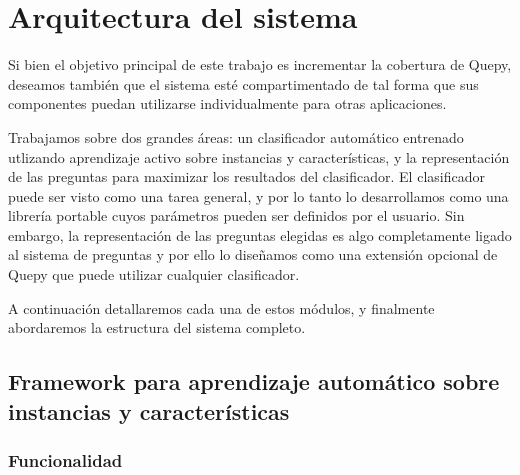 \chapter{Arquitectura del sistema}

Si bien el objetivo principal de este trabajo es incrementar la cobertura de Quepy, deseamos también que el sistema esté compartimentado de tal forma que sus componentes puedan utilizarse individualmente para otras aplicaciones.

Trabajamos sobre dos grandes áreas: un clasificador automático entrenado utlizando aprendizaje activo sobre instancias y características, y la representación de las preguntas para maximizar los resultados del clasificador. El clasificador puede ser visto como una tarea general, y por lo tanto lo desarrollamos como una librería portable cuyos parámetros pueden ser definidos por el usuario. Sin embargo, la representación de las preguntas elegidas es algo completamente ligado al sistema de preguntas y por ello lo diseñamos como una extensión opcional de Quepy que puede utilizar cualquier clasificador.

A continuación detallaremos cada una de estos módulos, y finalmente abordaremos la estructura del sistema completo.

\section{Framework para aprendizaje automático sobre instancias y características}
\subsection{Funcionalidad}

